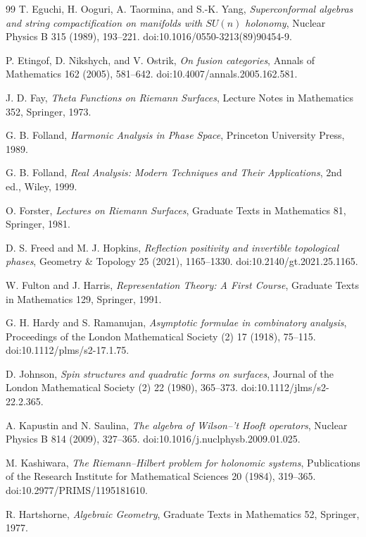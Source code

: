 \documentclass[11pt]{article}
\theoremstyle{definition}
\begin{document}
\begin{thebibliography}{99}
T. Eguchi, H. Ooguri, A. Taormina, and S.-K. Yang,
\emph{Superconformal algebras and string compactification on manifolds
with $SU(n)$ holonomy},
Nuclear Physics B 315 (1989), 193--221.
doi:10.1016/0550-3213(89)90454-9.

P. Etingof, D. Nikshych, and V. Ostrik,
\emph{On fusion categories},
Annals of Mathematics 162 (2005), 581--642.
doi:10.4007/annals.2005.162.581.

J. D. Fay,
\emph{Theta Functions on Riemann Surfaces},
Lecture Notes in Mathematics 352, Springer, 1973.

G. B. Folland,
\emph{Harmonic Analysis in Phase Space},
Princeton University Press, 1989.

G. B. Folland,
\emph{Real Analysis: Modern Techniques and Their Applications}, 2nd ed.,
Wiley, 1999.

O. Forster,
\emph{Lectures on Riemann Surfaces},
Graduate Texts in Mathematics 81, Springer, 1981.

D. S. Freed and M. J. Hopkins,
\emph{Reflection positivity and invertible topological phases},
Geometry \& Topology 25 (2021), 1165--1330.
doi:10.2140/gt.2021.25.1165.

W. Fulton and J. Harris,
\emph{Representation Theory: A First Course},
Graduate Texts in Mathematics 129, Springer, 1991.

G. H. Hardy and S. Ramanujan,
\emph{Asymptotic formulae in combinatory analysis},
Proceedings of the London Mathematical Society (2) 17 (1918), 75--115.
doi:10.1112/plms/s2-17.1.75.

D. Johnson,
\emph{Spin structures and quadratic forms on surfaces},
Journal of the London Mathematical Society (2) 22 (1980), 365--373.
doi:10.1112/jlms/s2-22.2.365.

A. Kapustin and N. Saulina,
\emph{The algebra of Wilson--'t Hooft operators},
Nuclear Physics B 814 (2009), 327--365.
doi:10.1016/j.nuclphysb.2009.01.025.

M. Kashiwara,
\emph{The Riemann--Hilbert problem for holonomic systems},
Publications of the Research Institute for Mathematical Sciences 20
(1984), 319--365.
doi:10.2977/PRIMS/1195181610.

R. Hartshorne,
\emph{Algebraic Geometry},
Graduate Texts in Mathematics 52, Springer, 1977.


\end{thebibliography}
\end{document}
